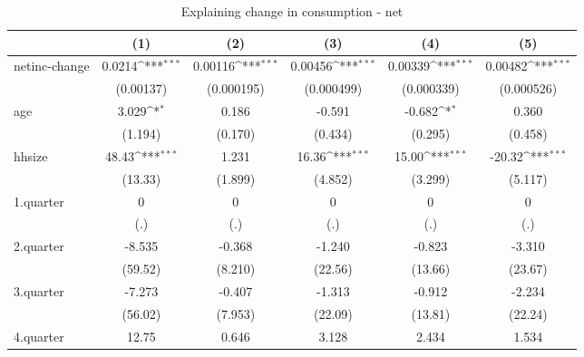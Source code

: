 \begin{table}[htbp]\centering
\def\sym#1{\ifmmode^{#1}\else\(^{#1}\)\fi}
\caption{\label{tab:2.1B-deltacons-net} Explaining change in consumption - net}
\begin{tabular}{l*{5}{c}}
\hline\hline
            &\multicolumn{1}{c}{(1)}         &\multicolumn{1}{c}{(2)}         &\multicolumn{1}{c}{(3)}         &\multicolumn{1}{c}{(4)}         &\multicolumn{1}{c}{(5)}         \\
\hline
netinc-change&      0.0214\sym{***}&     0.00116\sym{***}&     0.00456\sym{***}&     0.00339\sym{***}&     0.00482\sym{***}\\
            &   (0.00137)         &  (0.000195)         &  (0.000499)         &  (0.000339)         &  (0.000526)         \\
age         &       3.029\sym{*}  &       0.186         &      -0.591         &      -0.682\sym{*}  &       0.360         \\
            &     (1.194)         &     (0.170)         &     (0.434)         &     (0.295)         &     (0.458)         \\
hhsize      &       48.43\sym{***}&       1.231         &       16.36\sym{***}&       15.00\sym{***}&      -20.32\sym{***}\\
            &     (13.33)         &     (1.899)         &     (4.852)         &     (3.299)         &     (5.117)         \\
1.quarter   &           0         &           0         &           0         &           0         &           0         \\
            &         (.)         &         (.)         &         (.)         &         (.)         &         (.)         \\
2.quarter   &      -8.535         &      -0.368         &      -1.240         &      -0.823         &      -3.310         \\
            &     (59.52)         &     (8.210)         &     (22.56)         &     (13.66)         &     (23.67)         \\
3.quarter   &      -7.273         &      -0.407         &      -1.313         &      -0.912         &      -2.234         \\
            &     (56.02)         &     (7.953)         &     (22.09)         &     (13.81)         &     (22.24)         \\
4.quarter   &       12.75         &       0.646         &       3.128         &       2.434         &       1.534         \\

\end{tabular}
\end{table}
